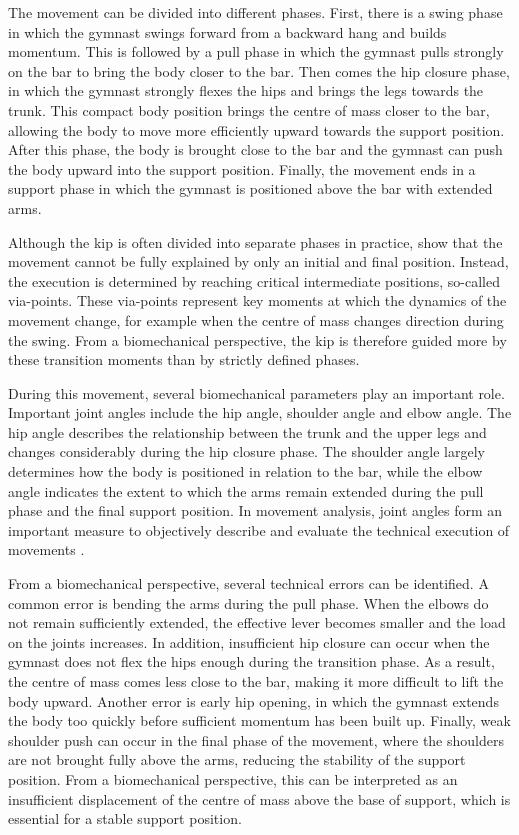 The movement can be divided into different phases. First, there is a swing phase in which the gymnast swings forward from a backward hang and builds momentum. This is followed by a pull phase in which the gymnast pulls strongly on the bar to bring the body closer to the bar. Then comes the hip closure phase, in which the gymnast strongly flexes the hips and brings the legs towards the trunk. This compact body position brings the centre of mass closer to the bar, allowing the body to move more efficiently upward towards the support position. After this phase, the body is brought close to the bar and the gymnast can push the body upward into the support position. Finally, the movement ends in a support phase in which the gymnast is positioned above the bar with extended arms.

Although the kip is often divided into separate phases in practice, \textcite{Yamasaki2010} show that the movement cannot be fully explained by only an initial and final position. Instead, the execution is determined by reaching critical intermediate positions, so-called via-points. These via-points represent key moments at which the dynamics of the movement change, for example when the centre of mass changes direction during the swing. From a biomechanical perspective, the kip is therefore guided more by these transition moments than by strictly defined phases.

During this movement, several biomechanical parameters play an important role. Important joint angles include the hip angle, shoulder angle and elbow angle. The hip angle describes the relationship between the trunk and the upper legs and changes considerably during the hip closure phase. The shoulder angle largely determines how the body is positioned in relation to the bar, while the elbow angle indicates the extent to which the arms remain extended during the pull phase and the final support position. In movement analysis, joint angles form an important measure to objectively describe and evaluate the technical execution of movements \autocite{FARANA201588}.

From a biomechanical perspective, several technical errors can be identified. A common error is bending the arms during the pull phase. When the elbows do not remain sufficiently extended, the effective lever becomes smaller and the load on the joints increases. In addition, insufficient hip closure can occur when the gymnast does not flex the hips enough during the transition phase. As a result, the centre of mass comes less close to the bar, making it more difficult to lift the body upward. Another error is early hip opening, in which the gymnast extends the body too quickly before sufficient momentum has been built up. Finally, weak shoulder push can occur in the final phase of the movement, where the shoulders are not brought fully above the arms, reducing the stability of the support position. From a biomechanical perspective, this can be interpreted as an insufficient displacement of the centre of mass above the base of support, which is essential for a stable support position.

